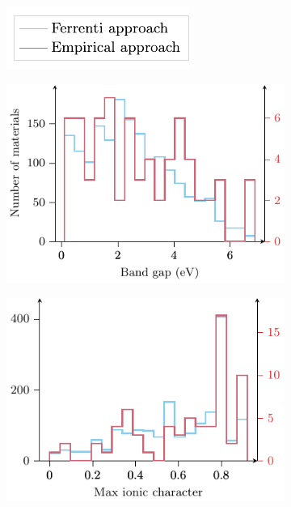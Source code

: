 \documentclass[superscriptaddress,
preprint,
 amsmath,amssymb,
 aps,
]{revtex4-2}
\begin{document}
\begin{figure}[t]
    \begin{subfigure}[b]{1\textwidth}
    \centering
    \includegraphics{figure7-legend.pdf}
  \end{subfigure}
  \par\bigskip
\begin{subfigure}[b]{0.45\textwidth}
    \includegraphics{figure7a.pdf}
    \subcaption{}
\end{subfigure}
\begin{subfigure}[b]{0.45\textwidth}
    \includegraphics{figure7b.pdf}
    \subcaption{}
\end{subfigure}%


\end{figure}
\end{document}
